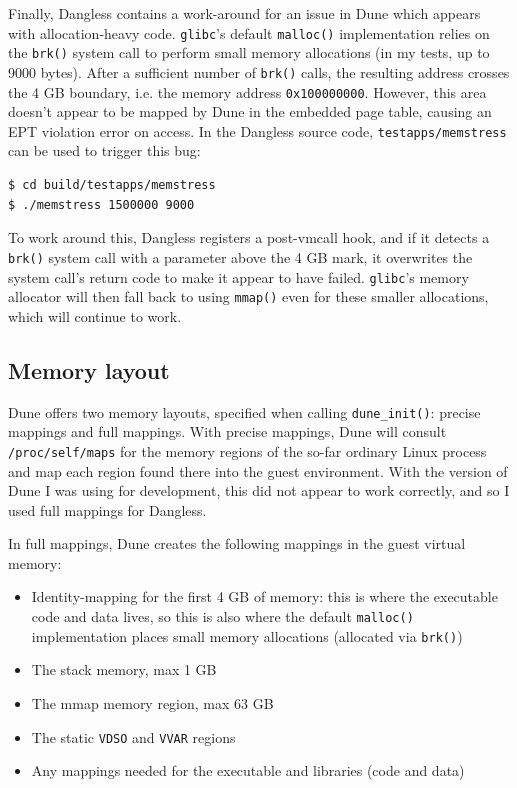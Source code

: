 Finally, Dangless contains a work-around for an issue in Dune which appears with allocation-heavy code. \texttt{glibc}'s default \lstinline!malloc()! implementation relies on the \lstinline!brk()! system call to perform small memory allocations (in my tests, up to 9000 bytes). After a sufficient number of \lstinline!brk()! calls, the resulting address crosses the 4 GB boundary, i.e. the memory address \texttt{0x100000000}. However, this area doesn't appear to be mapped by Dune in the embedded page table, causing an EPT violation error on access. In the Dangless source code, \texttt{testapps/memstress} can be used to trigger this bug:

\begin{verbatim}
$ cd build/testapps/memstress
$ ./memstress 1500000 9000
\end{verbatim}

To work around this, Dangless registers a post-vmcall hook, and if it detects a \lstinline!brk()! system call with a parameter above the 4 GB mark, it overwrites the system call's return code to make it appear to have failed. \texttt{glibc}'s memory allocator will then fall back to using \lstinline!mmap()! even for these smaller allocations, which will continue to work.

\subsection{Memory layout}

Dune offers two memory layouts, specified when calling \lstinline!dune_init()!: precise mappings and full mappings.
With precise mappings, Dune will consult \texttt{/proc/self/maps} for the memory regions of the so-far ordinary Linux process and map each region found there into the guest environment. With the version of Dune I was using for development, this did not appear to work correctly, and so I used full mappings for Dangless.

In full mappings, Dune creates the following mappings in the guest virtual memory:

\begin{itemize}
	\item Identity-mapping for the first 4 GB of memory: this is where the executable code and data lives, so this is also where the default \lstinline!malloc()! implementation places small memory allocations (allocated via \lstinline!brk()!)
	\item The stack memory, max 1 GB
	\item The mmap memory region, max 63 GB
	\item The static \texttt{VDSO} and \texttt{VVAR} regions
	\item Any mappings needed for the executable and libraries (code and data)
\end{itemize}

